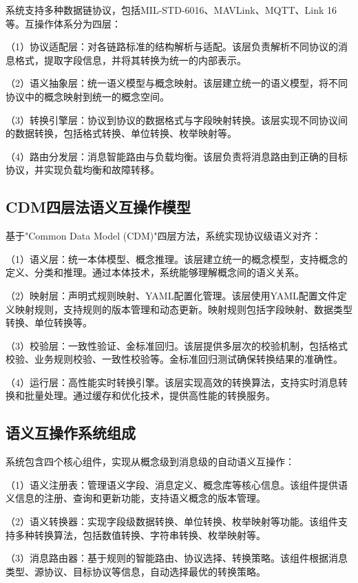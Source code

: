 系统支持多种数据链协议，包括MIL-STD-6016、MAVLink、MQTT、Link 16等。互操作体系分为四层：

（1）协议适配层：对各链路标准的结构解析与适配。该层负责解析不同协议的消息格式，提取字段信息，并将其转换为统一的内部表示。

（2）语义抽象层：统一语义模型与概念映射。该层建立统一的语义模型，将不同协议中的概念映射到统一的概念空间。

（3）转换引擎层：协议到协议的数据格式与字段映射转换。该层实现不同协议间的数据转换，包括格式转换、单位转换、枚举映射等。

（4）路由分发层：消息智能路由与负载均衡。该层负责将消息路由到正确的目标协议，并实现负载均衡和故障转移。

\subsection{CDM四层法语义互操作模型}

基于"Common Data Model (CDM)"四层方法，系统实现协议级语义对齐：

（1）语义层：统一本体模型、概念推理。该层建立统一的概念模型，支持概念的定义、分类和推理。通过本体技术，系统能够理解概念间的语义关系。

（2）映射层：声明式规则映射、YAML配置化管理。该层使用YAML配置文件定义映射规则，支持规则的版本管理和动态更新。映射规则包括字段映射、数据类型转换、单位转换等。

（3）校验层：一致性验证、金标准回归。该层提供多层次的校验机制，包括格式校验、业务规则校验、一致性校验等。金标准回归测试确保转换结果的准确性。

（4）运行层：高性能实时转换引擎。该层实现高效的转换算法，支持实时消息转换和批量处理。通过缓存和优化技术，提供高性能的转换服务。

\subsection{语义互操作系统组成}

系统包含四个核心组件，实现从概念级到消息级的自动语义互操作：

（1）语义注册表：管理语义字段、消息定义、概念库等核心信息。该组件提供语义信息的注册、查询和更新功能，支持语义概念的版本管理。

（2）语义转换器：实现字段级数据转换、单位转换、枚举映射等功能。该组件支持多种转换算法，包括数值转换、字符串转换、枚举映射等。

（3）消息路由器：基于规则的智能路由、协议选择、转换策略。该组件根据消息类型、源协议、目标协议等信息，自动选择最优的转换策略。

